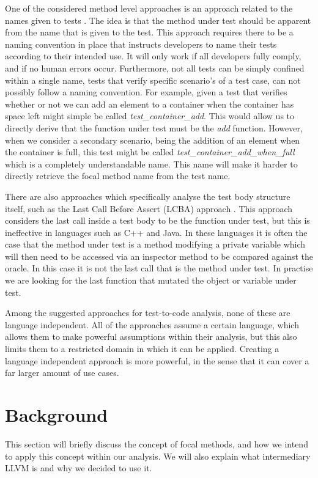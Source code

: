 \documentclass[11pt]{article}
\begin{document}
\begin{multicols}{2}
One of the considered method level approaches is an approach related to the names given to tests \cite{van2009establishing}. The idea is that the method under test should be apparent from the name that is given to the test. This approach requires there to be a naming convention in place that instructs developers to name their tests according to their intended use. It will only work if all developers fully comply, and if no human errors occur. Furthermore, not all tests can be simply confined within a single name, tests that verify specific scenario's of a test case, can not possibly follow a naming convention. For example, given a test that verifies whether or not we can add an element to a container when the container has space left might simple be called \textit{test\_container\_add}. This would allow us to directly derive that the function under test must be the \textit{add} function. However, when we consider a secondary scenario, being the addition of an element when the container is full, this test might be called \textit{test\_container\_add\_when\_full} which is a completely understandable name. This name will make it harder to directly retrieve the focal method name from the test name.

There are also approaches which specifically analyse the test body structure itself, such as the Last Call Before Assert (LCBA) approach \cite{van2009establishing}. This approach considers the last call inside a test body to be the function under test, but this is ineffective in languages such as C++ and Java. In these languages it is often the case that the method under test is a method modifying a private variable which will then need to be accessed via an inspector method to be compared against the oracle. In this case it is not the last call that is the method under test. In practise we are looking for the last function that mutated the object or variable under test.

Among the suggested approaches for test-to-code analysis, none of these are language independent. All of the approaches assume a certain language, which allows them to make powerful assumptions within their analysis, but this also limits them to a restricted domain in which it can be applied. Creating a language independent approach is more powerful, in the sense that it can cover a far larger amount of use cases. 

\section{Background}
This section will briefly discuss the concept of focal methods, and how we intend to apply this concept within our analysis. We will also explain what intermediary LLVM is and why we decided to use it.


\end{multicols}
\end{document}
